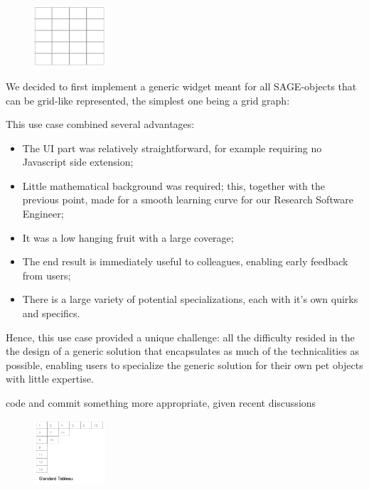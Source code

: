 \documentclass{deliverablereport}
\begin{document}

\begin{figure}
    \begin{center}
      \includegraphics[width=100px]{images/gridwidget}
\end{center}
\end{figure}

We decided to first implement a generic widget meant for all SAGE-objects that can
be grid-like represented, the simplest one being a grid graph:

This use case combined several advantages:
\begin{itemize}
\item The UI part was relatively straightforward, for example
  requiring no Javascript side extension;
\item Little mathematical background was required; this, together with
  the previous point, made for a smooth learning curve for our
  Research Software Engineer;
\item It was a low hanging fruit with a large coverage;
\item The end result is immediately useful to colleagues, enabling
  early feedback from users;
\item There is a large variety of potential specializations, each with
  it's own quirks and specifics.
\end{itemize}
Hence, this use case provided a unique challenge: all the difficulty
resided in the the design of a generic solution that encapsulates as
much of the technicalities as possible, enabling users to specialize
the generic solution for their own pet objects with little expertise.


\TODO code and commit something more appropriate, given recent discussions


\begin{figure}
    \begin{center}
      \includegraphics[width=100px]{images/tableauwidget}
\end{center}
\end{figure}
\end{document}

